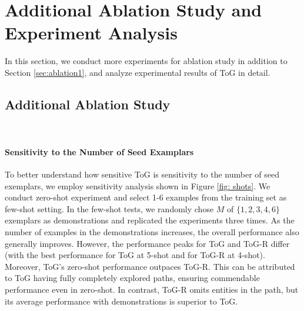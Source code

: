 \documentclass{article} %
\begin{document}
\begin{figure}[htb]
\end{figure}


\section{Additional Ablation Study and Experiment Analysis}
In this section, we conduct more experiments for ablation study in addition to Section \ref{sec:ablation1}, and analyze experimental results of ToG in detail.

\subsection{Additional Ablation Study}~\label{sec:ablation2}
\paragraph{Sensitivity to the Number of Seed Examplars}
To better understand how sensitive ToG is sensitivity to the number of seed exemplars, we employ sensitivity analysis shown in Figure \ref{fig: shots}. We conduct zero-shot experiment and select 1-6 examples from the training set as few-shot setting. In the few-shot tests, we randomly chose $M$ of $\{1,2,3,4,6\}$ exemplars as demonstrations and replicated the experiments three times. As the number of examples in the demonstrations increases, the overall performance also generally improves. However, the performance peaks for ToG and ToG-R differ (with the best performance for ToG at 5-shot and for ToG-R at 4-shot). Moreover, ToG's zero-shot performance outpaces ToG-R. This can be attributed to ToG having fully completely explored paths, ensuring commendable performance even in zero-shot. In contrast, ToG-R omits entities in the path, but its average performance with demonstrations is superior to ToG.
\end{document}
